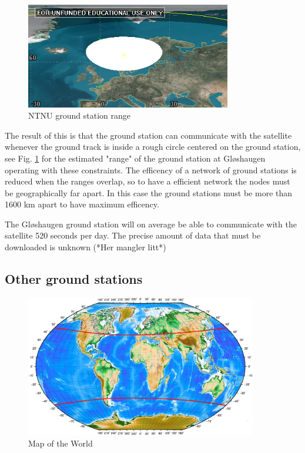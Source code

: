 \begin{figure}
  \begin{center}
    \includegraphics[width=0.8\textwidth]{Figures/ntnu_footprint}
  \end{center}
  \caption[ntnu footprint]{NTNU ground station range}
  \label{fig:ntnu_range}
\end{figure}

The result of this is that the ground station can communicate with the satellite whenever the ground track is inside a rough circle centered on the ground station, see Fig. \ref{fig:ntnu_range} for the estimated "range" of the ground station at Gløshaugen operating with these constraints. The efficency of a network of ground stations is reduced when the ranges overlap, so to have a efficient network the nodes must be geographically far apart. In this case the ground stations must be more than 1600 km apart to have maximum efficency.

The Gløshaugen ground station will on average be able to communicate with the satellite 520 seconds per day. The precise amount of data that must be downloaded is unknown (*Her mangler litt*)

\subsection{Other ground stations}
\begin{figure}
  \begin{center}
    \includegraphics[width=0.9\textwidth]{Figures/verdenskart}
  \end{center}
  \caption[world]{Map of the World}
  \label{fig:world}
\end{figure}

